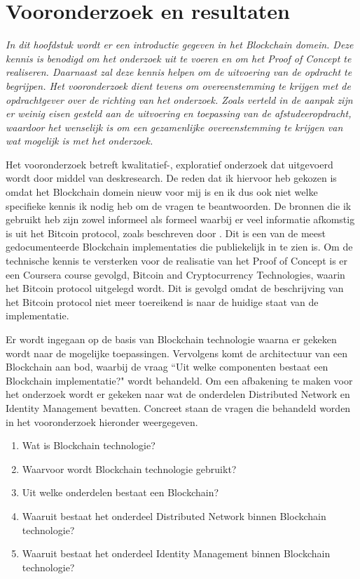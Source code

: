 \chapter{Vooronderzoek en resultaten}

\textit{In dit hoofdstuk wordt er een introductie gegeven in het Blockchain domein. Deze kennis is benodigd om het onderzoek uit te voeren en om het Proof of Concept te realiseren. Daarnaast zal deze kennis helpen om de uitvoering van de opdracht te begrijpen. Het vooronderzoek dient tevens om overeenstemming te krijgen met de opdrachtgever over de richting van het onderzoek. Zoals verteld in de aanpak zijn er weinig eisen gesteld aan de uitvoering en toepassing van de afstudeeropdracht, waardoor het wenselijk is om een gezamenlijke overeenstemming te krijgen van wat mogelijk is met het onderzoek.}

Het vooronderzoek betreft kwalitatief-, exploratief onderzoek dat uitgevoerd wordt door middel van deskresearch. De reden dat ik hiervoor heb gekozen is omdat het Blockchain domein nieuw voor mij is en ik dus ook niet welke specifieke kennis ik nodig heb om de vragen te beantwoorden. De bronnen die ik gebruikt heb zijn zowel informeel als formeel waarbij er veel informatie afkomstig is uit het Bitcoin protocol, zoals beschreven door \cite{nakamoto2008bitcoin}. Dit is een van de meest gedocumenteerde Blockchain implementaties die publiekelijk in te zien is. Om de technische kennis te versterken voor de realisatie van het Proof of Concept is er een Coursera course gevolgd, Bitcoin and Cryptocurrency Technologies, waarin het Bitcoin protocol uitgelegd wordt. Dit is gevolgd omdat de beschrijving van het Bitcoin protocol niet meer toereikend is naar de huidige staat van de implementatie.

Er wordt ingegaan op de basis van Blockchain technologie waarna er gekeken wordt naar de mogelijke toepassingen. Vervolgens komt de architectuur van een Blockchain aan bod, waarbij de vraag ``Uit welke componenten bestaat een Blockchain implementatie?" wordt behandeld. Om een afbakening te maken voor het onderzoek wordt er gekeken naar wat de onderdelen Distributed Network en Identity Management bevatten. Concreet staan de vragen die behandeld worden in het vooronderzoek hieronder weergegeven.

\begin{enumerate}[noitemsep]
  \item Wat is Blockchain technologie?
  \item Waarvoor wordt Blockchain technologie gebruikt?
  \item Uit welke onderdelen bestaat een Blockchain?
  \item Waaruit bestaat het onderdeel Distributed Network binnen Blockchain technologie?
  \item Waaruit bestaat het onderdeel Identity Management binnen Blockchain technologie?
\end{enumerate}

